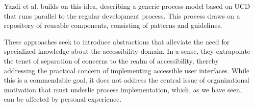 	Yazdi et al. \cite{Yazdi:2011} builds on this idea, describing a generic process model based on \ac{UCD} that runs parallel to the regular development process. This process draws on a repository of reusable components, consisting of patterns and guidelines.

	These approaches seek to introduce abstractions that alleviate the need for specialized knowledge about the accessibility domain. In a sense, they extrapolate the tenet of separation of concerns to the realm of accessibility, thereby addressing the practical concern of implementing accessible user interfaces. While this is a commendable goal, it does not address the central issue of organizational motivation that must underlie process implementation, which, as we have seen, can be affected by personal experience.




